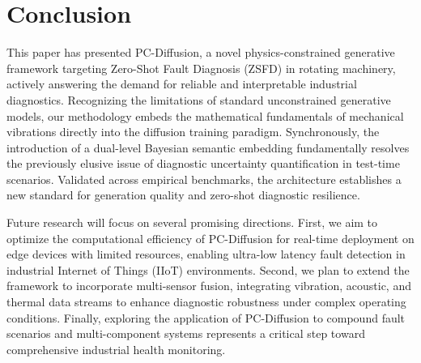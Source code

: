 \section{Conclusion}
\label{sec:conclusion}

This paper has presented PC-Diffusion, a novel physics-constrained generative framework targeting Zero-Shot Fault Diagnosis (ZSFD) in rotating machinery, actively answering the demand for reliable and interpretable industrial diagnostics. Recognizing the limitations of standard unconstrained generative models, our methodology embeds the mathematical fundamentals of mechanical vibrations directly into the diffusion training paradigm. Synchronously, the introduction of a dual-level Bayesian semantic embedding fundamentally resolves the previously elusive issue of diagnostic uncertainty quantification in test-time scenarios. Validated across empirical benchmarks, the architecture establishes a new standard for generation quality and zero-shot diagnostic resilience. 

Future research will focus on several promising directions. First, we aim to optimize the computational efficiency of PC-Diffusion for real-time deployment on edge devices with limited resources, enabling ultra-low latency fault detection in industrial Internet of Things (IIoT) environments. Second, we plan to extend the framework to incorporate multi-sensor fusion, integrating vibration, acoustic, and thermal data streams to enhance diagnostic robustness under complex operating conditions. Finally, exploring the application of PC-Diffusion to compound fault scenarios and multi-component systems represents a critical step toward comprehensive industrial health monitoring.